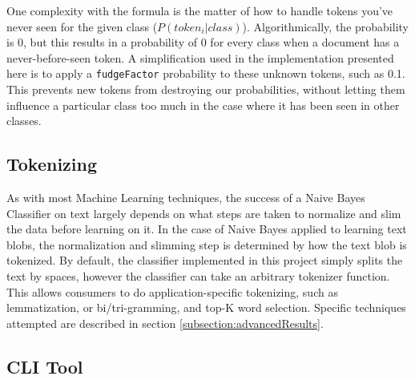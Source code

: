 One complexity with the formula is the matter of how to handle tokens you've never seen for the given
class (\begin{math}P(token_i | class)\end{math}). Algorithmically, the probability is 0, but this results in a
probability of 0 for every class when a document has a never-before-seen token. A simplification used in the
implementation presented here is to apply a \texttt{fudgeFactor} probability to these unknown tokens, such as 0.1.
This prevents new tokens from destroying our probabilities, without letting them influence a particular class too much
in the case where it has been seen in other classes.

\subsection{Tokenizing}
\label{subsection:tokenizing}
As with most Machine Learning techniques, the success of a Naive Bayes Classifier on text largely depends on what steps
are taken to normalize and slim the data before learning on it. In the case of Naive Bayes applied to learning text
blobs, the normalization and slimming step is determined by how the text blob is tokenized. By default, the classifier
implemented in this project simply splits the text by spaces, however the classifier can take an arbitrary tokenizer
function. This allows consumers to do application-specific tokenizing, such as lemmatization, or bi/tri-gramming, and
top-K word selection. Specific techniques attempted are described in section \ref{subsection:advancedResults}.

\subsection{CLI Tool}
\label{subsection:cliTool}


